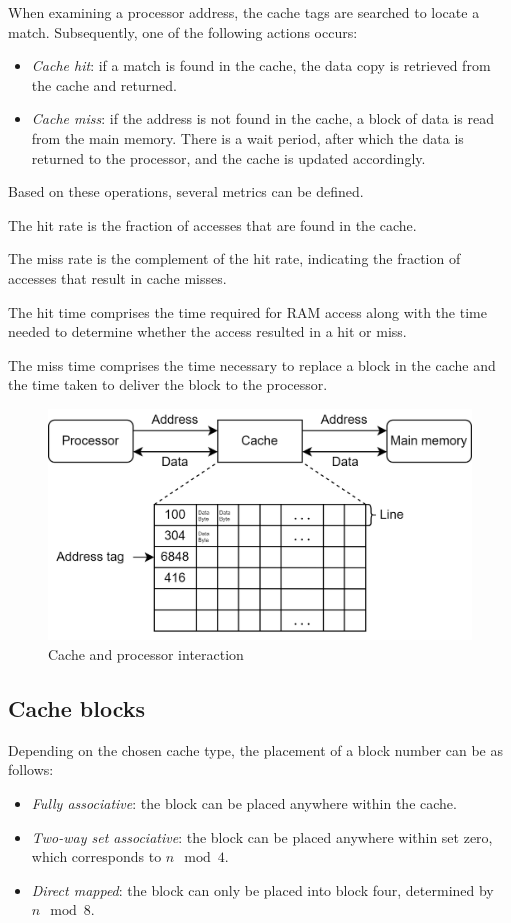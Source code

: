 When examining a processor address, the cache tags are searched to locate a match. 
Subsequently, one of the following actions occurs:
\begin{itemize}
    \item \textit{Cache hit}: if a match is found in the cache, the data copy is retrieved from the cache and returned.
    \item \textit{Cache miss}: if the address is not found in the cache, a block of data is read from the main memory.
        There is a wait period, after which the data is returned to the processor, and the cache is updated accordingly.
\end{itemize}
Based on these operations, several metrics can be defined.
\begin{definition}
    The hit rate is the fraction of accesses that are found in the cache.
\end{definition}
\begin{definition}
    The miss rate is the complement of the hit rate, indicating the fraction of accesses that result in cache misses.
\end{definition}
\begin{definition}
    The hit time comprises the time required for RAM access along with the time needed to determine whether the access resulted in a hit or miss.
\end{definition}
\begin{definition}
    The miss time comprises the time necessary to replace a block in the cache and the time taken to deliver the block to the processor.
\end{definition}
\begin{figure}[H]
    \centering
    \includegraphics[width=0.5\linewidth]{images/cache.png}
    \caption{Cache and processor interaction}
\end{figure}

\subsection{Cache blocks}
Depending on the chosen cache type, the placement of a block number can be as follows:
\begin{itemize}
    \item \textit{Fully associative}: the block can be placed anywhere within the cache.
    \item \textit{Two-way set associative}: the block can be placed anywhere within set zero, which corresponds to $n \mod 4$.
    \item \textit{Direct mapped}: the block can only be placed into block four, determined by $n \mod 8$. 
\end{itemize}


